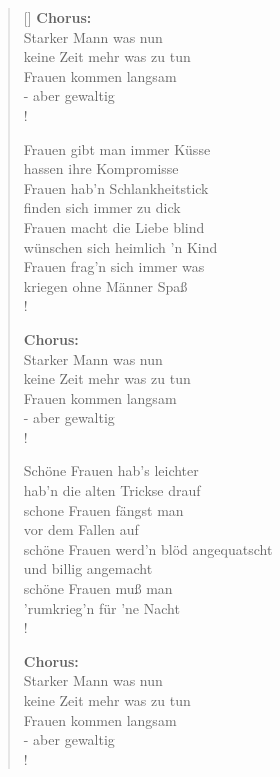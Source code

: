 \documentclass[a4paper]{scrartcl}
\begin{document}
\begin{verse}[\versewidth]
\textbf{Chorus:}\\
Starker Mann was nun\\
keine Zeit mehr was zu tun\\
Frauen kommen langsam\\
- aber gewaltig\\!

\newpage
Frauen gibt man immer Küsse\\
hassen ihre Kompromisse\\
Frauen hab'n Schlankheitstick\\
finden sich immer zu dick\\
Frauen macht die Liebe blind\\
wünschen sich heimlich 'n Kind\\
Frauen frag'n sich immer was\\
kriegen ohne Männer Spaß\\!

\textbf{Chorus:}\\
Starker Mann was nun\\
keine Zeit mehr was zu tun\\
Frauen kommen langsam\\
- aber gewaltig\\!


Schöne Frauen hab's leichter\\
hab'n die alten Trickse drauf\\
schone Frauen fängst man\\
vor dem Fallen auf\\
schöne Frauen werd'n blöd angequatscht\\
und billig angemacht\\
schöne Frauen muß man\\
'rumkrieg'n für 'ne Nacht\\!

\textbf{Chorus:}\\
Starker Mann was nun\\
keine Zeit mehr was zu tun\\
Frauen kommen langsam\\
- aber gewaltig\\!

 \end{verse}

 
 
\end{document}
